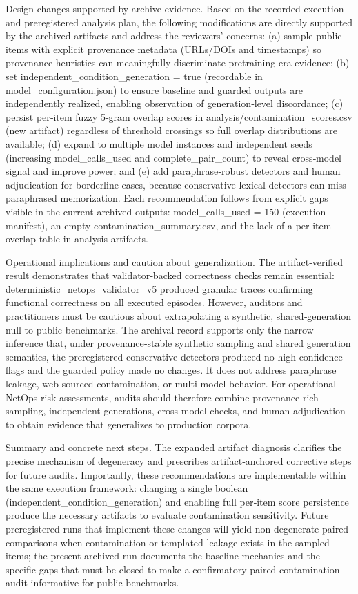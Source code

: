 \documentclass[conference]{IEEEtran}
\begin{document}
Design changes supported by archive evidence. Based on the recorded execution and preregistered analysis plan, the following modifications are directly supported by the archived artifacts and address the reviewers' concerns: (a) sample public items with explicit provenance metadata (URLs/DOIs and timestamps) so provenance heuristics can meaningfully discriminate pretraining‑era evidence; (b) set independent\_condition\_generation = true (recordable in model\_configuration.json) to ensure baseline and guarded outputs are independently realized, enabling observation of generation‑level discordance; (c) persist per‑item fuzzy 5‑gram overlap scores in analysis/contamination\_scores.csv (new artifact) regardless of threshold crossings so full overlap distributions are available; (d) expand to multiple model instances and independent seeds (increasing model\_calls\_used and complete\_pair\_count) to reveal cross‑model signal and improve power; and (e) add paraphrase‑robust detectors and human adjudication for borderline cases, because conservative lexical detectors can miss paraphrased memorization. Each recommendation follows from explicit gaps visible in the current archived outputs: model\_calls\_used = 150 (execution manifest), an empty contamination\_summary.csv, and the lack of a per‑item overlap table in analysis artifacts.

Operational implications and caution about generalization. The artifact‑verified result demonstrates that validator‑backed correctness checks remain essential: deterministic\_netops\_validator\_v5 produced granular traces confirming functional correctness on all executed episodes. However, auditors and practitioners must be cautious about extrapolating a synthetic, shared‑generation null to public benchmarks. The archival record supports only the narrow inference that, under provenance‑stable synthetic sampling and shared generation semantics, the preregistered conservative detectors produced no high‑confidence flags and the guarded policy made no changes. It does not address paraphrase leakage, web‑sourced contamination, or multi‑model behavior. For operational NetOps risk assessments, audits should therefore combine provenance‑rich sampling, independent generations, cross‑model checks, and human adjudication to obtain evidence that generalizes to production corpora.

Summary and concrete next steps. The expanded artifact diagnosis clarifies the precise mechanism of degeneracy and prescribes artifact‑anchored corrective steps for future audits. Importantly, these recommendations are implementable within the same execution framework: changing a single boolean (independent\_condition\_generation) and enabling full per‑item score persistence produce the necessary artifacts to evaluate contamination sensitivity. Future preregistered runs that implement these changes will yield non‑degenerate paired comparisons when contamination or templated leakage exists in the sampled items; the present archived run documents the baseline mechanics and the specific gaps that must be closed to make a confirmatory paired contamination audit informative for public benchmarks.
\end{document}
